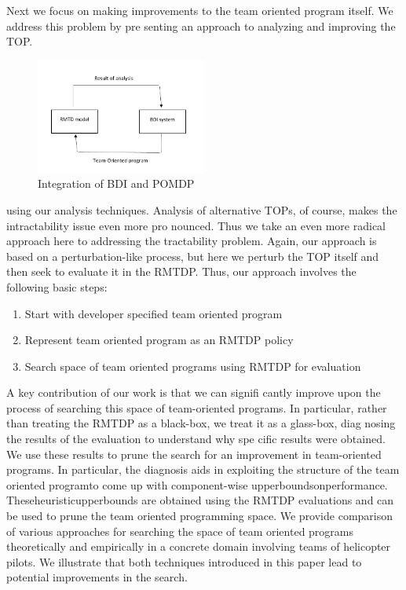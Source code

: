 \documentclass{IEEEtran}
\begin{document}
 Next we focus on making improvements to the team
oriented program itself. We address this problem by pre
senting an approach to analyzing and improving the TOP.

\begin{figure}[htb]
        \centering
        \includegraphics[width=0.5\textwidth]{figure0001.pdf}
        \caption{Integration of BDI and POMDP}
        \label{fig:0001}
        \end{figure}

 using our analysis techniques. Analysis of alternative TOPs,
 of course, makes the intractability issue even more pro
nounced. Thus we take an even more radical approach here
 to addressing the tractability problem. Again, our approach
 is based on a perturbation-like process, but here we perturb
 the TOP itself and then seek to evaluate it in the RMTDP.
 Thus, our approach involves the following basic steps:
 \begin{enumerate}
    \item Start with developer specified team oriented program
    \item Represent team oriented program as an RMTDP policy
    \item Search space of team oriented programs using RMTDP for evaluation
 \end{enumerate}
 

 A key contribution of our work is that we can signifi
cantly improve upon the process of searching this space of
 team-oriented programs. In particular, rather than treating
 the RMTDP as a black-box, we treat it as a glass-box, diag
nosing the results of the evaluation to understand why spe
cific results were obtained. We use these results to prune
 the search for an improvement in team-oriented programs.
 In particular, the diagnosis aids in exploiting the structure of
 the team oriented programto come up with component-wise
 upperboundsonperformance. Theseheuristicupperbounds
 are obtained using the RMTDP evaluations and can be used
 to prune the team oriented programming space. We provide
 comparison of various approaches for searching the space
 of team oriented programs theoretically and empirically in
 a concrete domain involving teams of helicopter pilots. We
 illustrate that both techniques introduced in this paper lead
 to potential improvements in the search.
\end{document}
